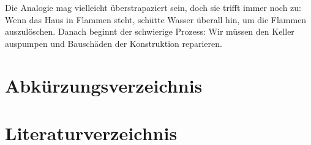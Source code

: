 \documentclass[
        onecolumn,
        a4paper,
        abstracton,
        parskip=half
        ,final
        ]{scrartcl}
\begin{document}
Die Analogie mag vielleicht {\"u}berstrapaziert sein, doch sie trifft immer noch zu: Wenn das Haus in Flammen steht, sch{\"u}tte Wasser {\"u}berall hin, um die Flammen auszul{\"o}schen. Danach beginnt der schwierige Prozess: Wir m{\"u}ssen den Keller auspumpen und Bausch{\"a}den der Konstruktion reparieren.

\clearpage

\section{Abk{\"u}rzungsverzeichnis}
  \label{sec5:Abkuerzungsverzeichnis}

\begin{acronym}[ESZB]


\end{acronym}

\vspace{10pt}
  \newpage
    \singlespacing



\section{Literaturverzeichnis}
  \label{sec6:Literaturverzeichnis}
  \newpage

\end{document}
